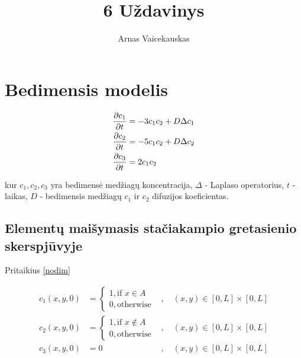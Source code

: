 \documentclass{article}
\title{6 Uždavinys}
\author{Arnas Vaicekauskas}
\begin{document}
\maketitle

\section{Bedimensis modelis}

\begin{equation}
\begin{subequations} \label{nodim}
    \begin{align}
    \frac{\partial c_1}{\partial t}&=-3c_1c_2+D\Delta c_1\\
    \frac{\partial c_2}{\partial t}&=-5c_1c_2+D\Delta c_2\\
    \frac{\partial c_3}{\partial t}&=2c_1c_2
    \end{align}
\end{subequations}
\end{equation}

kur $c_1,c_2,c_3$ yra bedimensė medžiagų koncentracija, 
$\Delta$ - Laplaso operatorius, $t$ - laikas, 
$D$ - bedimensis medžiagų $c_1$ ir $c_2$ difuzijos koeficientas.


\subsection{Elementų maišymasis stačiakampio gretasienio skerspjūvyje}

Pritaikius \ref{nodim}

\begin{equation}
    \begin{aligned}
        c_1(x, y, 0) &= 
        \begin{cases}
            1, \text{if } x\in A\\
            0, \text{otherwise}
        \end{cases}&, \quad (x, y)\in[0,L]\times[0,L]\\
        c_2(x, y, 0) &= 
        \begin{cases}
            1, \text{if } x\notin A\\
            0, \text{otherwise}
        \end{cases}&, \quad (x, y)\in[0,L]\times[0,L]\\
        c_3(x, y, 0) &= 0&, \quad (x, y)\in[0,L]\times[0,L]
    \end{aligned}
\end{equation}
\end{document}
